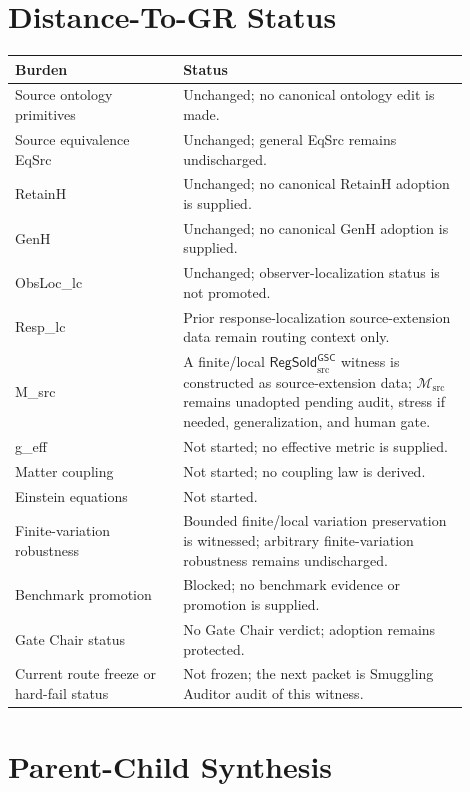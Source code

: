 \documentclass[11pt]{article}
\newcommand{\Msrc}{\mathcal{M}_{\mathrm{src}}}
\newcommand{\RegSold}{\mathsf{RegSold}_{\mathrm{src}}^{\mathsf{GSC}}}
\begin{document}
\section{Distance-To-GR Status}

\begin{center}
\begin{tabular}{p{0.33\linewidth}p{0.57\linewidth}}
\hline
Burden & Status \\
\hline
Source ontology primitives & Unchanged; no canonical ontology edit is made. \\
Source equivalence EqSrc & Unchanged; general EqSrc remains undischarged. \\
RetainH & Unchanged; no canonical RetainH adoption is supplied. \\
GenH & Unchanged; no canonical GenH adoption is supplied. \\
ObsLoc\_lc & Unchanged; observer-localization status is not promoted. \\
Resp\_lc & Prior response-localization source-extension data remain routing context only. \\
M\_src & A finite/local \(\RegSold\) witness is constructed as source-extension data; \(\Msrc\) remains unadopted pending audit, stress if needed, generalization, and human gate. \\
g\_eff & Not started; no effective metric is supplied. \\
Matter coupling & Not started; no coupling law is derived. \\
Einstein equations & Not started. \\
Finite-variation robustness & Bounded finite/local variation preservation is witnessed; arbitrary finite-variation robustness remains undischarged. \\
Benchmark promotion & Blocked; no benchmark evidence or promotion is supplied. \\
Gate Chair status & No Gate Chair verdict; adoption remains protected. \\
Current route freeze or hard-fail status & Not frozen; the next packet is Smuggling Auditor audit of this witness. \\
\hline
\end{tabular}
\end{center}

\section{Parent-Child Synthesis}
\end{document}

